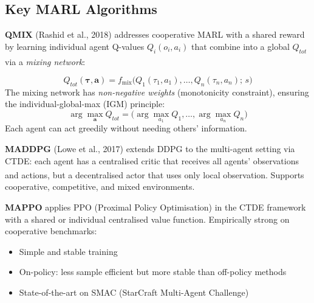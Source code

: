 \subsection{Key MARL Algorithms}
\begin{tcbitemize}[ skin=sectionraster ]

    \tcbitem[title=Value Decomposition: QMIX, raster multicolumn=3]
    \textbf{QMIX} (Rashid et al., 2018) addresses cooperative MARL with a shared
    reward by learning individual agent Q-values $Q_i(o_i, a_i)$ that combine
    into a global $Q_{tot}$ via a \emph{mixing
    network}:\textsuperscript{\cite[][p.~452]{weissMultiagentSystems2013}}

    \begin{equation}
        Q_{tot}(\boldsymbol{\tau}, \mathbf{a}) = f_{\text{mix}}\bigl(Q_1(\tau_1, a_1), \ldots, Q_n(\tau_n, a_n);\, s\bigr)
    \end{equation}
    The mixing network has \emph{non-negative weights} (monotonicity constraint),
    ensuring the individual-global-max (IGM) principle:
    \[
        \arg\max_{\mathbf{a}} Q_{tot} = \bigl(\arg\max_{a_1} Q_1, \ldots, \arg\max_{a_n} Q_n\bigr)
    \]
    Each agent can act greedily without needing others' information.

    \tcbitem[title=MADDPG and MAPPO, raster multicolumn=3]
    \textbf{MADDPG} (Lowe et al., 2017) extends DDPG to the multi-agent setting
    via CTDE: each agent has a centralised critic that receives all agents'
    observations and actions, but a decentralised actor that uses only local
    observation.\textsuperscript{\cite[][p.~455]{weissMultiagentSystems2013}}
    Supports cooperative, competitive, and mixed environments.

    \textbf{MAPPO} applies PPO (Proximal Policy Optimisation) in the CTDE
    framework with a shared or individual centralised value function.
    Empirically strong on cooperative benchmarks:
    \begin{itemize}
        \item Simple and stable training
        \item On-policy: less sample efficient but more stable than off-policy methods
        \item State-of-the-art on SMAC (StarCraft Multi-Agent Challenge)
    \end{itemize}


\end{tcbitemize}
